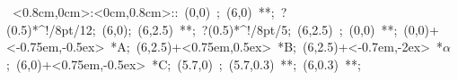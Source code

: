 \hbox{
\xy    <0.8cm,0cm>:<0cm,0.8cm>::
       (0,0) ; (6,0) **\dir{-}; ?(0.5)*^!/8pt/{12};
       (6,0); (6,2.5) **\dir{-}; ?(0.5)*^!/8pt/{5}; 
       (6,2.5) ; (0,0) **\dir{-};  
       (0,0)+<-0.75em,-0.5ex> *{A};
       (6,2.5)+<0.75em,0.5ex> *{B};
       (6,2.5)+<-0.7em,-2ex> *\hbox{$\alpha$};
       (6,0)+<0.75em,-0.5ex> *{C};
       (5.7,0) ; (5.7,0.3) **\dir{-}; (6,0.3) **\dir{-};       
\endxy}
	   

